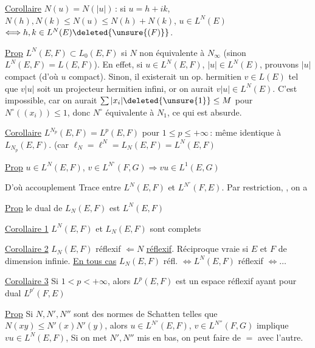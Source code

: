 
\uline{Corollaire} $N(u)=N(|u|)$\,: si $u=h+ik$, $N(h),N(k)\leq N(u)\leq N(h)+N(k)$,  $u\in L^N(E)$ \deleted{$\Longleftrightarrow$}$\Longleftrightarrow h,k\in L^N(E)\deleted{\unsure{(F)}}$. 


\uline{Prop} $L^N(E,F)\subset L_0(E,F)$ si $N$ non équivalente à $N_\infty$\unsure{;} (sinon $L^N(E,F)=L(E,F)$). En effet, si $u\in L^N(E,F)$,  $|u|\in L^N(E)$, prouvons $|u|$ compact (d'où $u$ compact). Sinon, il existerait un op. hermitien $v\in L(E)$ tel que $v|u|$ soit un projecteur hermitien infini, or on aurait $v|u|\in L^N(E)$. C'est impossible, car on  aurait $\sum|x_i|\deleted{\unsure{1}}\leq M$ pour $N^\circ((x_i))\leq 1$, donc $N^\circ$ équivalente à $N_1$, ce qui est absurde.

\uline{Corollaire} $L^{N_p}(E,F)=L^p(E,F)$ pour $1\leq p\leq+\infty$\,:  même identique à $L_{N_p}(E,F)$. (car $\ell_N=\ell^N=L_N(E,F)=L^N(E,F)$\unsure{)}

\uline{Prop} $u\in L^N(E,F)$, $v\in L^{N^\circ}(F,G)\Rightarrow vu\in L^1(E,G)$

D'où accouplement Trace entre $L^N(E,F)$ et $L^{N^\circ}(F,E)$. Par restriction,  , on a

\uline{Prop} le dual de $L_N(E,F)$ est $L^N(E,F)$

\uline{Corollaire 1} $L^N(E,F)$ et $L_N(E,F)$ sont complets

\uline{Corollaire 2} $L_N(E,F)$ réflexif $\Leftarrow N$ \uline{réflexif}. Réciproque vraie si $E$ et $F$ de dimension infinie. \uline{En tous cas} $L_N(E,F)$ réfl. $\Longleftrightarrow L^N(E,F)$ réflexif $\Longleftrightarrow\ldots$

\uline{Corollaire 3} Si $1<p<+\infty$, alors $L^p(E,F)$ est un espace réflexif ayant pour dual $L^{p'}(F,E)$

\uline{Prop} Si $N,N',N''$ sont des normes de Schatten telles que $N(xy)\leq N'(x)N'(y)$, alors $u\in L^{N'}(E,F)$, $v\in L^{N''}(F,G)$ implique $vu\in L^N(E,F)$,  Si on met  $N',N''$  mis en bas, on peut faire de $=$ avec l'autre.

